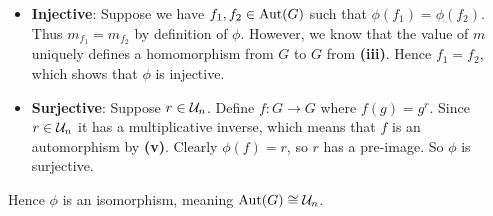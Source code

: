 \begin{questions}
\begin{partquestions}{\roman*}
\begin{itemize}
            \item \textbf{Injective}: Suppose we have $f_1, f_2 \in \mathrm{Aut}(G)$ such that $\phi(f_1) = \phi(f_2)$. Thus $m_{f_1} = m_{f_2}$ by definition of $\phi$. However, we know that the value of $m$ uniquely defines a homomorphism from $G$ to $G$ from \textbf{(iii)}. Hence $f_1 = f_2$, which shows that $\phi$ is injective.

            \item \textbf{Surjective}: Suppose $r \in \mathcal{U}_{n}$. Define $f: G \to G$ where $f(g) = g^r$. Since $r \in \mathcal{U}_{n}$ it has a multiplicative inverse, which means that $f$ is an automorphism by \textbf{(v)}. Clearly $\phi(f) = r$, so $r$ has a pre-image. So $\phi$ is surjective.
        \end{itemize}
        Hence $\phi$ is an isomorphism, meaning $\mathrm{Aut}(G) \cong \mathcal{U}_{n}$.
    \end{partquestions}
\end{questions}
